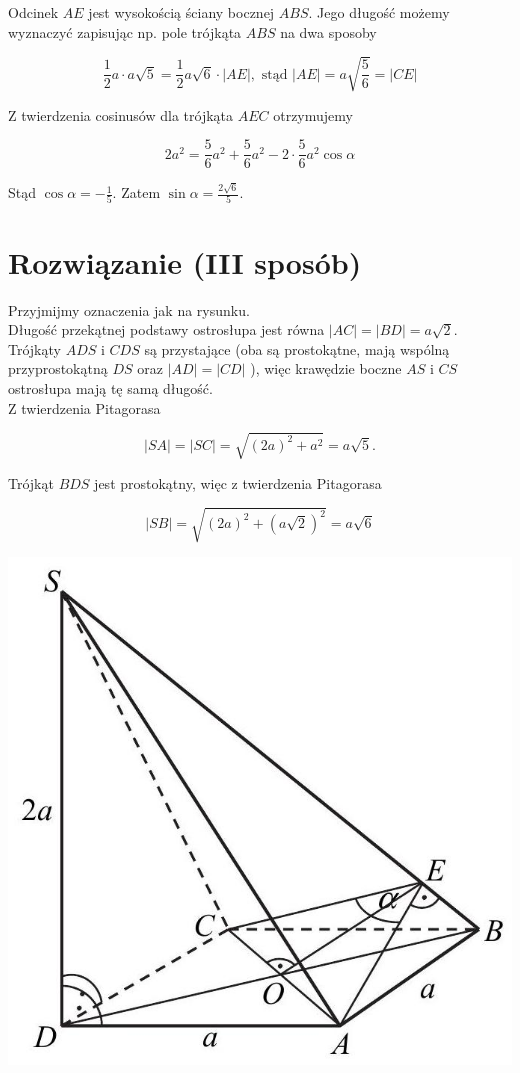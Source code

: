 \documentclass[10pt]{article}
\begin{document}
Odcinek $A E$ jest wysokością ściany bocznej $A B S$. Jego długość możemy wyznaczyć zapisując np. pole trójkąta $A B S$ na dwa sposoby

$$
\frac{1}{2} a \cdot a \sqrt{5}=\frac{1}{2} a \sqrt{6} \cdot|A E|, \text { stąd }|A E|=a \sqrt{\frac{5}{6}}=|C E|
$$

Z twierdzenia cosinusów dla trójkąta $A E C$ otrzymujemy

$$
2 a^{2}=\frac{5}{6} a^{2}+\frac{5}{6} a^{2}-2 \cdot \frac{5}{6} a^{2} \cos \alpha
$$

Stąd $\cos \alpha=-\frac{1}{5}$. Zatem $\sin \alpha=\frac{2 \sqrt{6}}{5}$.

\section*{Rozwiązanie (III sposób)}
Przyjmijmy oznaczenia jak na rysunku.\\
Długość przekątnej podstawy ostrosłupa jest równa $|A C|=|B D|=a \sqrt{2}$.\\
Trójkąty $A D S$ i $C D S$ są przystające (oba są prostokątne, mają wspólną przyprostokątną $D S$ oraz $|A D|=|C D|$ ), więc krawędzie boczne $A S$ i $C S$ ostrosłupa mają tę samą długość.\\
Z twierdzenia Pitagorasa

$$
|S A|=|S C|=\sqrt{(2 a)^{2}+a^{2}}=a \sqrt{5} .
$$

Trójkąt $B D S$ jest prostokątny, więc z twierdzenia Pitagorasa

$$
|S B|=\sqrt{(2 a)^{2}+(a \sqrt{2})^{2}}=a \sqrt{6}
$$

\begin{center}
\includegraphics[max width=\textwidth]{2025_02_07_f5f4e8f37e6baab02e47g-24}
\end{center}
\end{document}
